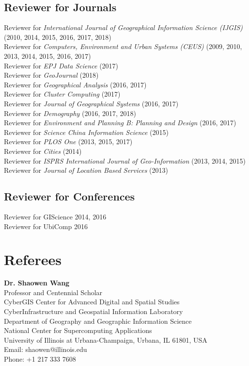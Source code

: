 \documentclass[11pt, a4paper]{article}
\begin{document}
\subsection*{Reviewer for Journals}
Reviewer for \emph{International Journal of Geographical Information Science (IJGIS)} (2010, 2014, 2015, 2016, 2017, 2018)\\
Reviewer for \emph{Computers, Environment and Urban Systems (CEUS)} (2009, 2010, 2013, 2014, 2015, 2016, 2017)\\
Reviewer for \emph{EPJ Data Science} (2017)\\
Reviewer for \emph{GeoJournal} (2018)\\
Reviewer for \emph{Geographical Analysis} (2016, 2017)\\
Reviewer for \emph{Cluster Computing} (2017)\\
Reviewer for \emph{Journal of Geographical Systems} (2016, 2017)\\
Reviewer for \emph{Demography} (2016, 2017, 2018)\\
Reviewer for \emph{Environment and Planning B: Planning and Design} (2016, 2017)\\
Reviewer for \emph{Science China Information Science} (2015)\\
Reviewer for \emph{PLOS One} (2013, 2015, 2017)\\
Reviewer for \emph{Cities} (2014)\\
Reviewer for \emph{ISPRS International Journal of Geo-Information} (2013, 2014, 2015)\\
Reviewer for \emph{Journal of Location Based Services} (2013)
\subsection*{Reviewer for Conferences}
Reviewer for GIScience {2014, 2016}\\
Reviewer for UbiComp {2016}

\section*{Referees}
\noindent
\textbf{Dr. Shaowen Wang}\\
Professor and Centennial Scholar\\
CyberGIS Center for Advanced Digital and Spatial Studies\\
CyberInfrastructure and Geospatial Information Laboratory\\
Department of Geography and Geographic Information Science\\
National Center for Supercomputing Applications\\
University of Illinois at Urbana-Champaign, Urbana, IL 61801, USA\\
Email: shaowen@illinois.edu\\
Phone: +1 217 333 7608\\
\end{document}
